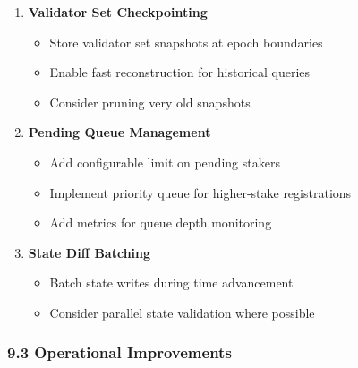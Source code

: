 \documentclass[
]{article}
\providecommand{\tightlist}{%
  \setlength{\itemsep}{0pt}\setlength{\parskip}{0pt}}
\begin{document}
\begin{enumerate}
\def\labelenumi{\arabic{enumi}.}
\item
  \textbf{Validator Set Checkpointing}

  \begin{itemize}
  \tightlist
  \item
    Store validator set snapshots at epoch boundaries
  \item
    Enable fast reconstruction for historical queries
  \item
    Consider pruning very old snapshots
  \end{itemize}
\item
  \textbf{Pending Queue Management}

  \begin{itemize}
  \tightlist
  \item
    Add configurable limit on pending stakers
  \item
    Implement priority queue for higher-stake registrations
  \item
    Add metrics for queue depth monitoring
  \end{itemize}
\item
  \textbf{State Diff Batching}

  \begin{itemize}
  \tightlist
  \item
    Batch state writes during time advancement
  \item
    Consider parallel state validation where possible
  \end{itemize}
\end{enumerate}

\subsubsection{9.3 Operational
Improvements}\label{93-operational-improvements}
\end{document}
